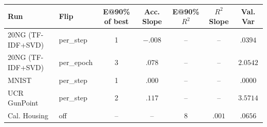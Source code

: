 \begin{tabular}{@{} l l c c c c c @{} }
\toprule
Run & Flip & E@90\% of best & Acc. Slope & E@90\% $R^2$ & $R^2$ Slope & Val. Var \\
\midrule
20NG (TF-IDF+SVD) & per\_step & 1 & $-.008$ & -- & -- & $.0394$ \\
20NG (TF-IDF+SVD) & per\_epoch & 3 & $.078$ & -- & -- & $2.0542$ \\
MNIST & per\_step & 1 & $.000$ & -- & -- & $.0000$ \\
UCR GunPoint & per\_step & 2 & $.117$ & -- & -- & $3.5714$ \\
Cal. Housing & off & -- & -- & 8 & $.001$ & $.0656$ \\
\bottomrule
\end{tabular}
